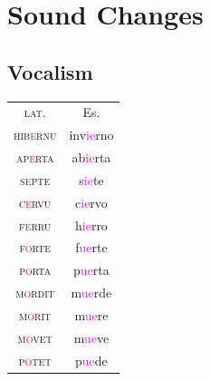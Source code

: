 \documentclass{report}[12pt]
\begin{document}
\section{Sound Changes}

\subsection{Vocalism}

\begin{tcolorbox}[title=Diphthongization II]
  
\end{tcolorbox}

\begin{tabular}{c c}
  \textsc{lat.} & Es. \\
  \textsc{hib\textcolor{red}{e}rnu} & inv\textcolor{magenta}{ie}rno \\
  \textsc{ap\textcolor{red}{e}rta} & ab\textcolor{magenta}{ie}rta \\
  \textsc{s\textcolor{red}{e}pte} & s\textcolor{magenta}{ie}te \\
  \textsc{c\textcolor{red}{e}rvu} & c\textcolor{magenta}{ie}rvo \\
  \textsc{f\textcolor{red}{e}rru} & h\textcolor{magenta}{ie}rro \\
  \textsc{f\textcolor{red}{o}rte} & f\textcolor{magenta}{ue}rte \\
  \textsc{p\textcolor{red}{o}rta} & p\textcolor{magenta}{ue}rta \\
  \textsc{m\textcolor{red}{o}rdit} & m\textcolor{magenta}{ue}rde \\
  \textsc{m\textcolor{red}{o}rit} & m\textcolor{magenta}{ue}re \\
  \textsc{m\textcolor{red}{o}vet} & m\textcolor{magenta}{ue}ve \\
  \textsc{p\textcolor{red}{o}tet} & p\textcolor{magenta}{ue}de \\
\end{tabular}

\begin{tcolorbox}[title=Metaphony]
  
\end{tcolorbox}
\end{document}
